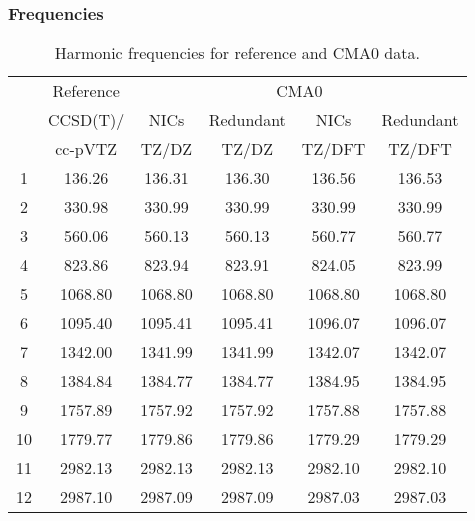 \documentclass[10pt,oneside]{article}
\begin{document}
\begin{table}[h!]
\subsubsection*{Frequencies}
\centering
\caption{Harmonic frequencies for reference and CMA0 data.}
\begin{tabular}{cccccc}
\toprule
{} & Reference & \multicolumn{4}{c}{CMA0} \\
{} &  CCSD(T)/ &    NICs &  Redundant &    NICs & Redundant \\
{} &   cc-pVTZ &   TZ/DZ &      TZ/DZ &  TZ/DFT &    TZ/DFT \\
\midrule
1  &    136.26 &  136.31 &     136.30 &  136.56 &    136.53 \\
2  &    330.98 &  330.99 &     330.99 &  330.99 &    330.99 \\
3  &    560.06 &  560.13 &     560.13 &  560.77 &    560.77 \\
4  &    823.86 &  823.94 &     823.91 &  824.05 &    823.99 \\
5  &   1068.80 & 1068.80 &    1068.80 & 1068.80 &   1068.80 \\
6  &   1095.40 & 1095.41 &    1095.41 & 1096.07 &   1096.07 \\
7  &   1342.00 & 1341.99 &    1341.99 & 1342.07 &   1342.07 \\
8  &   1384.84 & 1384.77 &    1384.77 & 1384.95 &   1384.95 \\
9  &   1757.89 & 1757.92 &    1757.92 & 1757.88 &   1757.88 \\
10 &   1779.77 & 1779.86 &    1779.86 & 1779.29 &   1779.29 \\
11 &   2982.13 & 2982.13 &    2982.13 & 2982.10 &   2982.10 \\
12 &   2987.10 & 2987.09 &    2987.09 & 2987.03 &   2987.03 \\
\bottomrule
\end{tabular}
\end{table}
\end{document}
